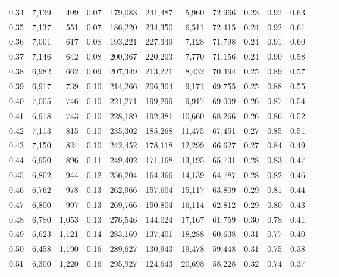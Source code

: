 \begin{tabular}{rrrrrrrrrrrrrr}
0.34 &   7,139 &    499 &  0.07 &  179,083 &  241,487 &   5,960 &  72,966 &  0.23 &  0.92 &      0.63 \\
0.35 &   7,137 &    551 &  0.07 &  186,220 &  234,350 &   6,511 &  72,415 &  0.24 &  0.92 &      0.61 \\
0.36 &   7,001 &    617 &  0.08 &  193,221 &  227,349 &   7,128 &  71,798 &  0.24 &  0.91 &      0.60 \\
0.37 &   7,146 &    642 &  0.08 &  200,367 &  220,203 &   7,770 &  71,156 &  0.24 &  0.90 &      0.58 \\
0.38 &   6,982 &    662 &  0.09 &  207,349 &  213,221 &   8,432 &  70,494 &  0.25 &  0.89 &      0.57 \\
0.39 &   6,917 &    739 &  0.10 &  214,266 &  206,304 &   9,171 &  69,755 &  0.25 &  0.88 &      0.55 \\
0.40 &   7,005 &    746 &  0.10 &  221,271 &  199,299 &   9,917 &  69,009 &  0.26 &  0.87 &      0.54 \\
0.41 &   6,918 &    743 &  0.10 &  228,189 &  192,381 &  10,660 &  68,266 &  0.26 &  0.86 &      0.52 \\
0.42 &   7,113 &    815 &  0.10 &  235,302 &  185,268 &  11,475 &  67,451 &  0.27 &  0.85 &      0.51 \\
0.43 &   7,150 &    824 &  0.10 &  242,452 &  178,118 &  12,299 &  66,627 &  0.27 &  0.84 &      0.49 \\
0.44 &   6,950 &    896 &  0.11 &  249,402 &  171,168 &  13,195 &  65,731 &  0.28 &  0.83 &      0.47 \\
0.45 &   6,802 &    944 &  0.12 &  256,204 &  164,366 &  14,139 &  64,787 &  0.28 &  0.82 &      0.46 \\
0.46 &   6,762 &    978 &  0.13 &  262,966 &  157,604 &  15,117 &  63,809 &  0.29 &  0.81 &      0.44 \\
0.47 &   6,800 &    997 &  0.13 &  269,766 &  150,804 &  16,114 &  62,812 &  0.29 &  0.80 &      0.43 \\
0.48 &   6,780 &  1,053 &  0.13 &  276,546 &  144,024 &  17,167 &  61,759 &  0.30 &  0.78 &      0.41 \\
0.49 &   6,623 &  1,121 &  0.14 &  283,169 &  137,401 &  18,288 &  60,638 &  0.31 &  0.77 &      0.40 \\
0.50 &   6,458 &  1,190 &  0.16 &  289,627 &  130,943 &  19,478 &  59,448 &  0.31 &  0.75 &      0.38 \\
0.51 &   6,300 &  1,220 &  0.16 &  295,927 &  124,643 &  20,698 &  58,228 &  0.32 &  0.74 &      0.37 \\

\end{tabular}
